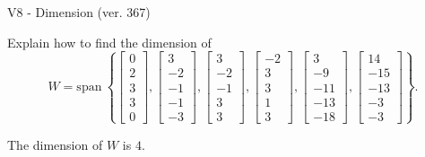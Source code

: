 \begin{exercise}
  \begin{exerciseTitle}V8 - Dimension (ver. 367)\end{exerciseTitle}
  \begin{exerciseStatement}
    Explain how to find the dimension of 
\[W=\mathrm{span}\ \left\{\left[\begin{array}{r}
0 \\
2 \\
3 \\
3 \\
0
\end{array}\right] , \left[\begin{array}{r}
3 \\
-2 \\
-1 \\
-1 \\
-3
\end{array}\right] , \left[\begin{array}{r}
3 \\
-2 \\
-1 \\
3 \\
3
\end{array}\right] , \left[\begin{array}{r}
-2 \\
3 \\
3 \\
1 \\
3
\end{array}\right] , \left[\begin{array}{r}
3 \\
-9 \\
-11 \\
-13 \\
-18
\end{array}\right] , \left[\begin{array}{r}
14 \\
-15 \\
-13 \\
-3 \\
-3
\end{array}\right]\right\}.\]



  \end{exerciseStatement}
  \begin{exerciseAnswer}
   The dimension of \(W\) is  \(4\).
  


  \end{exerciseAnswer}
\end{exercise}
